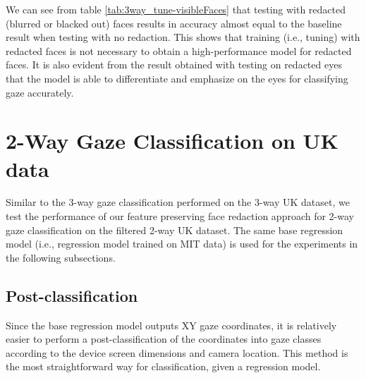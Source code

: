 We can see from table \ref{tab:3way_tune-visibleFaces} that testing with redacted (blurred or blacked out) faces results in accuracy almost equal to the baseline result when testing with no redaction. This shows that training (i.e., tuning) with redacted faces is not necessary to obtain a high-performance model for redacted faces. It is also evident from the result obtained with testing on redacted eyes that the model is able to differentiate and emphasize on the eyes for classifying gaze accurately.


\section{2-Way Gaze Classification on UK data}
Similar to the 3-way gaze classification performed on the 3-way UK dataset, we test the performance of our feature preserving face redaction approach for 2-way gaze classification on the filtered 2-way UK dataset. The same base regression model (i.e., regression model trained on MIT data) is used for the experiments in the following subsections.


\subsection{Post-classification}
Since the base regression model outputs XY gaze coordinates, it is relatively easier to perform a post-classification of the coordinates into gaze classes according to the device screen dimensions and camera location. This method is the most straightforward way for classification, given a regression model.

